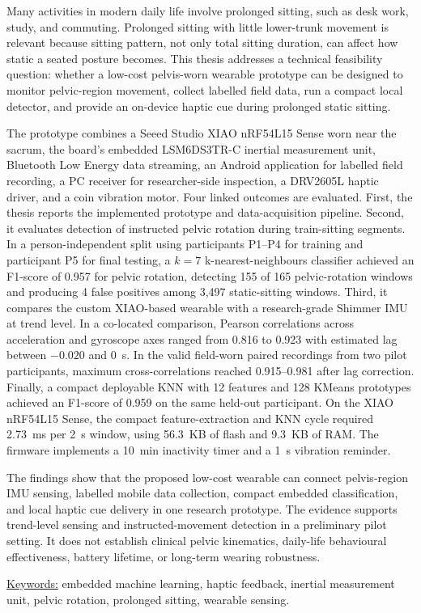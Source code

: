 Many activities in modern daily life involve prolonged sitting, such as desk work, study, and commuting. Prolonged sitting with little lower-trunk movement is relevant because sitting pattern, not only total sitting duration, can affect how static a seated posture becomes. This thesis addresses a technical feasibility question: whether a low-cost pelvis-worn wearable prototype can be designed to monitor pelvic-region movement, collect labelled field data, run a compact local detector, and provide an on-device haptic cue during prolonged static sitting.

The prototype combines a Seeed Studio XIAO nRF54L15 Sense worn near the sacrum, the board's embedded LSM6DS3TR-C inertial measurement unit, Bluetooth Low Energy data streaming, an Android application for labelled field recording, a PC receiver for researcher-side inspection, a DRV2605L haptic driver, and a coin vibration motor. Four linked outcomes are evaluated. First, the thesis reports the implemented prototype and data-acquisition pipeline. Second, it evaluates detection of instructed pelvic rotation during train-sitting segments. In a person-independent split using participants P1--P4 for training and participant P5 for final testing, a \(k=7\) k-nearest-neighbours classifier achieved an F1-score of 0.957 for pelvic rotation, detecting 155 of 165 pelvic-rotation windows and producing 4 false positives among 3{,}497 static-sitting windows. Third, it compares the custom XIAO-based wearable with a research-grade Shimmer IMU at trend level. In a co-located comparison, Pearson correlations across acceleration and gyroscope axes ranged from 0.816 to 0.923 with estimated lag between \(-0.020\) and 0~s. In the valid field-worn paired recordings from two pilot participants, maximum cross-correlations reached 0.915--0.981 after lag correction. Finally, a compact deployable KNN with 12 features and 128 KMeans prototypes achieved an F1-score of 0.959 on the same held-out participant. On the XIAO nRF54L15 Sense, the compact feature-extraction and KNN cycle required 2.73~ms per 2~s window, using 56.3~KB of flash and 9.3~KB of RAM. The firmware implements a 10~min inactivity timer and a 1~s vibration reminder.

The findings show that the proposed low-cost wearable can connect pelvis-region IMU sensing, labelled mobile data collection, compact embedded classification, and local haptic cue delivery in one research prototype. The evidence supports trend-level sensing and instructed-movement detection in a preliminary pilot setting. It does not establish clinical pelvic kinematics, daily-life behavioural effectiveness, battery lifetime, or long-term wearing robustness.

\vspace{1em}
\underline{Keywords:} embedded machine learning, haptic feedback, inertial measurement unit, pelvic rotation, prolonged sitting, wearable sensing.
